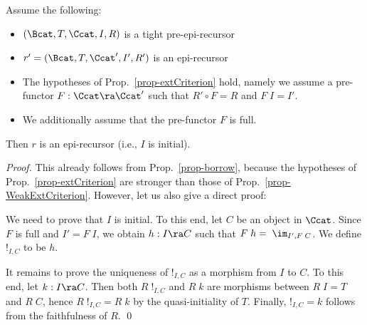 \medskip 
\begin{prop}\rm \label{prop-borrowStrong} 
	Assume the following:
	\begin{itemize}
		\item $(\Bcat,T,\Ccat,I,R)$ is a tight pre-epi-recursor
		\item $r'= (\Bcat,T,\Ccat',I',R') $ is an epi-recursor
		\item The hypotheses of Prop.~\ref{prop-extCriterion} hold, namely 
		we assume a pre-functor 
		$F : \Ccat \ra \Ccat'$  
		such that 
		$R' \circ F = R$ and 
		$F\;I = I'$.   
		\item We additionally assume that the pre-functor $F$ is full. 
	\end{itemize}
	Then $r$ is an epi-recursor (i.e., $I$ is initial).  
\end{prop} 
\medskip
%
\begin{proof}
	This already follows from Prop.~\ref{prop-borrow}, because 
	the hypotheses of Prop.~\ref{prop-extCriterion} are stronger than those of 
	Prop.~\ref{prop-WeakExtCriterion}. However, let us also give a direct proof:
	
	We need to prove that $I$ is initial. To this end, let $C$ be an object in $\Ccat$. 
	Since $F$ is full and $I'=F\;I$, we obtain $h : I \ra C$ 
	such that $F\;h = \;\im_{I',F\;C}$.  We define $!_{I,C}$ to be $h$.
	
   	It remains to prove the uniqueness of $!_{I,C}$ as a morphism from $I$ to $C$.  
   	To this end, let $k : I \ra C$. 
	Then both $R\;!_{I,C}$ and $R\;k$ are morphisms between $R\;I = T$ and $R\;C$, hence $R\;!_{I,C} = R\;k$ by the quasi-initiality of $T$. Finally, 
	$!_{I,C} = k$ follows from the faithfulness of $R$.  \qed
	
	
\end{proof} 
\medskip 


